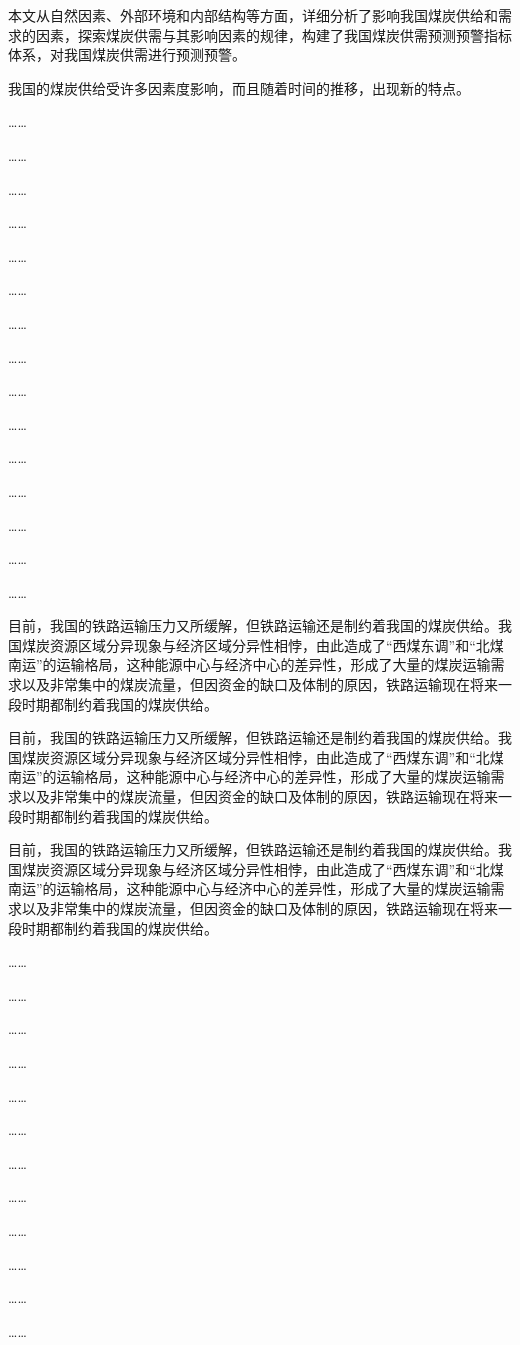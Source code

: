 本文从自然因素、外部环境和内部结构等方面，详细分析了影响我国煤炭供给和需求的因素，探索煤炭供需与其影响因素的规律，构建了我国煤炭供需预测预警指标体系，对我国煤炭供需进行预测预警。

我国的煤炭供给受许多因素度影响，而且随着时间的推移，出现新的特点。

……

……

……

……

……

……

……

……

……

……

……

……

……

……

……

目前，我国的铁路运输压力又所缓解，但铁路运输还是制约着我国的煤炭供给。我国煤炭资源区域分异现象与经济区域分异性相悖，由此造成了“西煤东调”和“北煤南运”的运输格局，这种能源中心与经济中心的差异性，形成了大量的煤炭运输需求以及非常集中的煤炭流量，但因资金的缺口及体制的原因，铁路运输现在将来一段时期都制约着我国的煤炭供给。

目前，我国的铁路运输压力又所缓解，但铁路运输还是制约着我国的煤炭供给。我国煤炭资源区域分异现象与经济区域分异性相悖，由此造成了“西煤东调”和“北煤南运”的运输格局，这种能源中心与经济中心的差异性，形成了大量的煤炭运输需求以及非常集中的煤炭流量，但因资金的缺口及体制的原因，铁路运输现在将来一段时期都制约着我国的煤炭供给。

目前，我国的铁路运输压力又所缓解，但铁路运输还是制约着我国的煤炭供给。我国煤炭资源区域分异现象与经济区域分异性相悖，由此造成了“西煤东调”和“北煤南运”的运输格局，这种能源中心与经济中心的差异性，形成了大量的煤炭运输需求以及非常集中的煤炭流量，但因资金的缺口及体制的原因，铁路运输现在将来一段时期都制约着我国的煤炭供给。


……

……

……

……

……

……

……

……

……

……

……

……

